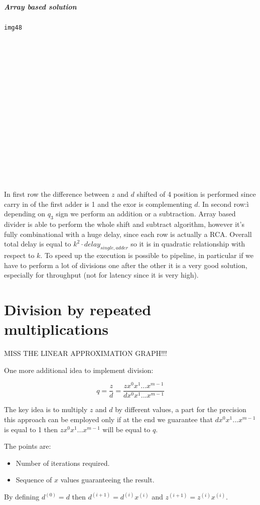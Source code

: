 \subparagraph{Array based solution}

\begin{verbatim}
img48



















\end{verbatim}

In first row the difference between $z$ and $d$ shifted of 4 position is performed since carry in of the first adder is 1 and the exor is complementing $d$. In second row:ì depending on $q_3$ sign we perform an addition or a subtraction.
Array based divider is able to perform the whole shift and subtract algorithm, however it's fully combinational with a huge delay, since each row is actually a RCA. Overall total delay is equal to $k^2 \cdot delay_{single,adder}$ so it is in quadratic relationship with respect to $k$. To speed up the execution is possible to pipeline, in particular if we have to perform a lot of divisions one after the other it is a very good solution, especially for throughput (not for latency since it is very high).

\section{Division by repeated multiplications}
MISS THE LINEAR APPROXIMATION GRAPH!!!

One more additional idea to implement division:

$$q=\frac{z}{d}=\frac{z x^{0} x^{1}... x^{m-1}}{d x^{0} x^{1}... x^{m-1}}$$

The key idea is to multiply $z$ and $d$ by different values, a part for the precision this approach can be employed only if at the end we guarantee that $d x^{0} x^{1}... x^{m-1}$ is equal to 1 then $z x^{0} x^{1}... x^{m-1}$ will be equal to $q$.

The points are:
\begin{itemize}
  \item Number of iterations required.
  \item Sequence of $x$ values guaranteeing the result.
\end{itemize}

By defining $d^{(0)}=d$ then $d^{(i+1)}=d^{(i)}x^{(i)}$ and $z^{(i+1)}=z^{(i)}x^{(i)}$.

